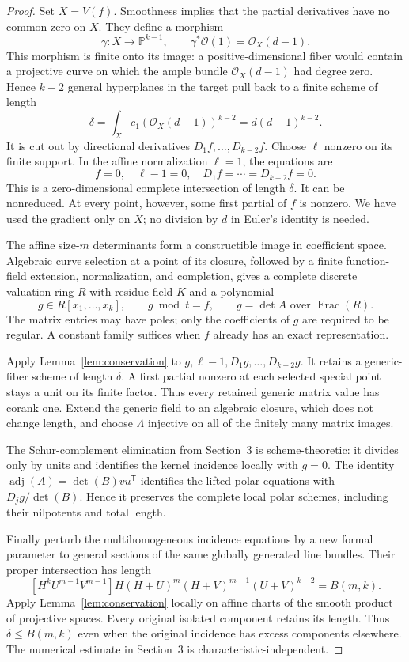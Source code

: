\documentclass[11pt]{article}
\theoremstyle{remark}\newtheorem{remark}[theorem]{Remark}
\DeclareMathOperator{\adj}{adj}
\newcommand{\PP}{\mathbb P}
\begin{document}
\begin{proof}
Set $X=V(f)$. Smoothness implies that the partial derivatives
have no common zero on $X$. They define a morphism
\[
 \gamma:X\longrightarrow\PP^{k-1},\qquad
 \gamma^*\mathcal O(1)=\mathcal O_X(d-1).
\]
This morphism is finite onto its image: a positive-dimensional
fiber would contain a projective curve on which the ample bundle
$\mathcal O_X(d-1)$ had degree zero. Hence $k-2$ general
hyperplanes in the target pull back to a finite scheme of length
\[
 \delta=\int_X c_1(\mathcal O_X(d-1))^{k-2}
        =d(d-1)^{k-2}.
\]
It is cut out by directional derivatives $D_1f,\ldots,D_{k-2}f$.
Choose $\ell$ nonzero on its finite support. In the affine
normalization $\ell=1$, the equations are
\[
 f=0,\quad \ell-1=0,\quad D_1f=\cdots=D_{k-2}f=0.
\]
This is a zero-dimensional complete intersection of length
$\delta$. It can be nonreduced. At every point, however, some
first partial of $f$ is nonzero. We have used the gradient only
on $X$; no division by $d$ in Euler's identity is needed.

The affine size-$m$ determinants form a constructible image in
coefficient space. Algebraic curve selection at a point of its
closure, followed by a finite function-field extension, normalization,
and completion, gives a complete discrete valuation ring $R$ with
residue field $K$ and a polynomial
\[
 g\in R[x_1,\ldots,x_k],\qquad g\bmod t=f,
 \qquad g=\det A\text{ over }\operatorname{Frac}(R).
\]
The matrix entries may have poles; only the coefficients of $g$
are required to be regular. A constant family suffices when $f$
already has an exact representation.

Apply Lemma~\ref{lem:conservation} to $g,\ell-1,D_1g,\ldots,D_{k-2}g$.
It retains a generic-fiber scheme of length $\delta$. A first
partial nonzero at each selected special point stays a unit on
its finite factor. Thus every retained generic matrix value has
corank one. Extend the generic field to an algebraic closure,
which does not change length, and choose $\Lambda$ injective on
all of the finitely many matrix images.

The Schur-complement elimination from Section~3 is
scheme-theoretic: it divides only by units and identifies the
kernel incidence locally with $g=0$. The identity
$\adj(A)=\det(B)vu^{\mathsf T}$ identifies the lifted polar
equations with $D_jg/\det(B)$. Hence it preserves the complete
local polar schemes, including their nilpotents and total length.

Finally perturb the multihomogeneous incidence equations by a
new formal parameter to general sections of the same globally
generated line bundles. Their proper intersection has length
\[
 [H^k U^{m-1}V^{m-1}]
 H(H+U)^m(H+V)^{m-1}(U+V)^{k-2}=B(m,k).
\]
Apply Lemma~\ref{lem:conservation} locally on affine charts of the
smooth product of projective spaces. Every original isolated
component retains its length. Thus $\delta\le B(m,k)$ even
when the original incidence has excess components elsewhere.
The numerical estimate in Section~3 is characteristic-independent.
\end{proof}
\end{document}
